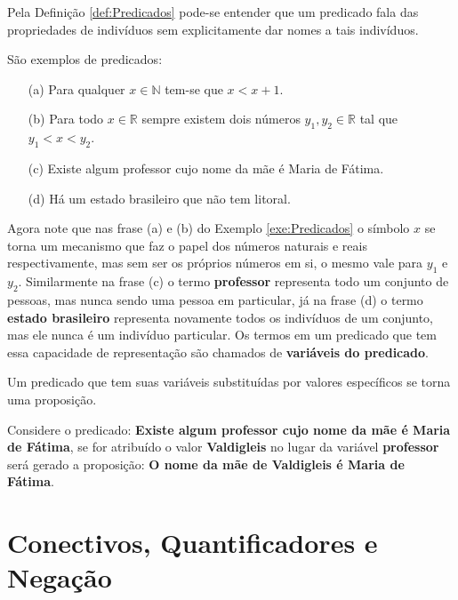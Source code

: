 Pela Definição \ref{def:Predicados} pode-se entender que um predicado fala das propriedades de indivíduos sem explicitamente dar nomes a tais indivíduos.

\begin{exem}\label{exe:Predicados}
	São exemplos de predicados:
	\begin{itemize}
		\item[(a)] Para qualquer $x \in \mathbb{N}$ tem-se que $x < x + 1$.
		\item[(b)] Para todo $x \in \mathbb{R}$ sempre existem dois números $y_1, y_2 \in \mathbb{R}$ tal que $y_1 < x < y_2$.
		\item[(c)] Existe algum professor cujo nome da mãe é Maria de Fátima.
		\item[(d)] Há um estado brasileiro que não tem litoral.
	\end{itemize}
\end{exem}

Agora note que nas frase (a) e (b) do Exemplo \ref{exe:Predicados} o símbolo $x$ se torna um mecanismo que faz o papel dos números naturais e reais respectivamente, mas sem ser os próprios números em si, o mesmo vale para $y_1$ e $y_2$. Similarmente na frase (c) o termo \textbf{professor} representa todo um conjunto de pessoas, mas nunca sendo uma pessoa em particular, já na frase (d) o termo \textbf{estado brasileiro} representa novamente todos os indivíduos de um conjunto, mas ele nunca é um indivíduo particular. Os termos em um predicado que tem essa capacidade de representação são chamados de \textbf{variáveis do predicado}.

\begin{rema}
	Um predicado que tem suas variáveis substituídas por valores específicos se torna uma proposição. 
\end{rema}

\begin{exem}\label{exe:AtribuirVariavelPredicado}
	Considere o predicado: \textbf{Existe algum professor cujo nome da mãe é Maria de Fátima}, se for atribuído o valor  \textbf{Valdigleis} no lugar da variável \textbf{professor} será gerado a proposição: \textbf{O nome da mãe de Valdigleis é Maria de Fátima}.
\end{exem}

\section{Conectivos, Quantificadores e Negação}\label{sec:Conectivo-Quantificador-Negacao}

